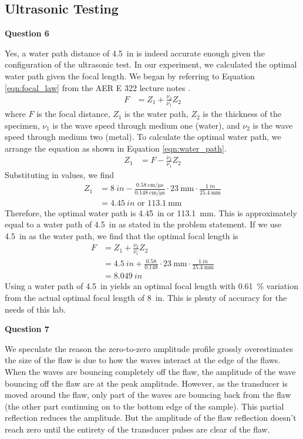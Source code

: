\documentclass[12 pt]{report}
\begin{document}
\subsection{Ultrasonic Testing} \label{ultrasonic_testing}
\textbf{Question 6}

Yes, a water path distance of \qty{4.5}{in} is indeed accurate enough given the configuration of the ultrasonic test. In our experiment, we calculated the optimal water path given the focal length. We began by referring to Equation \ref{eqn:focal_law} from the AER E \num{322} lecture notes \cite{lecture_notes}.
\begin{align}\label{eqn:focal_law}
	F&=Z_1+\frac{\nu_2}{\nu_1}Z_2
\end{align}
where $F$ is the focal distance, $Z_1$ is the water path, $Z_2$ is the thickness of the specimen, $\nu_1$ is the wave speed through medium one (water), and $\nu_2$ is the wave speed through medium two (metal). To calculate the optimal water path, we arrange the equation as shown in Equation \ref{eqn:water_path}.
\begin{align}\label{eqn:water_path}
	Z_1&=F-\frac{\nu_2}{\nu_1}Z_2
\end{align}
Substituting in values, we find
\begin{align*}
	Z_1&=\qty{8}{in}-\frac{\qty{0.58}{\cm\per\micro\second}}{\qty{0.148}{\cm\per\micro\second}}\cdot\qty{23}{\mm}\cdot\frac{\qty{1}{in}}{\qty{25.4}{\mm}}\\
	&=\qty{4.45}{in}\text{ or }\qty{113.1}{\mm}
\end{align*}
Therefore, the optimal water path is \qty{4.45}{in} or \qty{113.1}{\mm}. This is approximately equal to a water path of \qty{4.5}{in} as stated in the problem statement. If we use \qty{4.5}{in} as the water path, we find that the optimal focal length is
\begin{align*}
	F&=Z_1+\frac{\nu_2}{\nu_1}Z_2\\
	&=\qty{4.5}{in}+\frac{0.58}{0.148}\cdot\qty{23}{\mm}\cdot\frac{\qty{1}{in}}{\qty{25.4}{\mm}}\\
	&=\qty{8.049}{in}
\end{align*}
Using a water path of \qty{4.5}{in} yields an optimal focal length with \qty{0.61}{\percent} variation from the actual optimal focal length of \qty{8}{in}. This is plenty of accuracy for the needs of this lab.

\textbf{Question 7}

We speculate the reason the zero-to-zero amplitude profile grossly overestimates the size of the flaw is due to how the waves interact at the edge of the flaws. When the waves are bouncing completely off the flaw, the amplitude of the wave bouncing off the flaw are at the peak amplitude. However, as the transducer is moved around the flaw, only part of the waves are bouncing back from the flaw (the other part continuing on to the bottom edge of the sample). This partial reflection reduces the amplitude. But the amplitude of the flaw reflection doesn't reach zero until the entirety of the transducer pulses are clear of the flaw.
\end{document}
